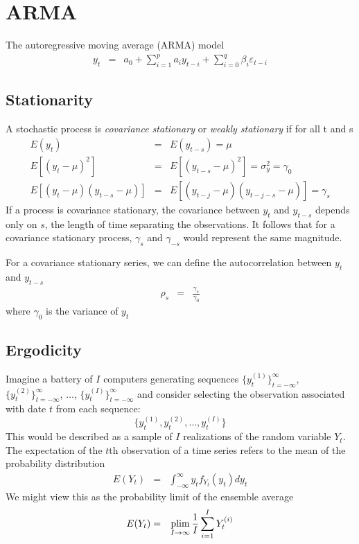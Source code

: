 \section[ARMA]{ARMA}
The autoregressive moving average (ARMA) model
\begin{eqnarray*}
y_{t}&=&a_{0}+\sum_{i=1}^{p}a_{i}y_{t-i}+\sum_{i=0}^{q}\beta_{i}\varepsilon_{t-i}
\end{eqnarray*}

\subsection{Stationarity}
A stochastic process is \textit{covariance stationary} or \textit{weakly stationary} if for all t and s
\begin{eqnarray*}
E(y_{t})&=&E(y_{t-s})=\mu\\
E\left[(y_{t}-\mu)^{2}\right]&=&E\left[(y_{t-s}-\mu)^{2}\right]=\sigma_{y}^{2}=\gamma_{0}\\
E\left[(y_{t}-\mu)(y_{t-s}-\mu)\right]&=&E\left[(y_{t-j}-\mu)(y_{t-j-s}-\mu)\right]=\gamma_{s}
\end{eqnarray*}
If a process is covariance stationary, the covariance between $y_{t}$ and $y_{t-s}$ depends only on $s$, the length of time separating the observations. It follows that for a covariance stationary process, $\gamma_{s}$ and $\gamma_{-s}$ would represent the same magnitude. 


For a covariance stationary series, we can define the autocorrelation between $y_{t}$ and $y_{t-s}$
\begin{eqnarray*}
\rho_{s}&=&\frac{\gamma_{s}}{\gamma_{0}}
\end{eqnarray*}
where $\gamma_{0}$ is the variance of $y_{t}$

\subsection{Ergodicity}
Imagine a battery of $I$ computers generating sequences $\{y_{t}^{(1)}\}_{t=-\infty}^{\infty}$, $\{y_{t}^{(2)}\}_{t=-\infty}^{\infty}$, $\dots$, $\{y_{t}^{(I)}\}_{t=-\infty}^{\infty}$ and consider selecting the observation associated with date $t$ from each sequence:
$$\{y_{t}^{(1)},y_{t}^{(2)},\dots,y_{t}^{(I)}\}$$
This would be described as a sample of $I$ realizations of the random variable $Y_{t}$. The expectation of the $t$th observation of a time series refers to the mean of the probability distribution
\begin{eqnarray*}
E(Y_{t})&=&\int_{-\infty}^{\infty}y_{t}f_{Y_{t}}(y_{t})dy_{t}
\end{eqnarray*}
We might view this as the probability limit of the ensemble average
\begin{eqnarray*}
E(Y_{t})&=&\operatorname*{plim}_{I\to\infty}\frac{1}{I}\sum_{i=1}^{I}Y_{t}^{(i)}
\end{eqnarray*}

